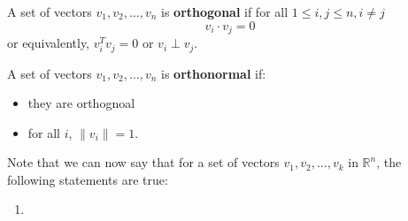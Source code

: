 \begin{definition}
	A set of vectors \(v_1, v_2, \ldots , v_n\) is \textbf{orthogonal} if for all \(1 \leq  i, j \leq n, i \neq j\)
	\[
		v_i \cdot v_j = 0
	\]
	or equivalently, \(v_i^T v_j = 0\) or \(v_i \perp v_j\).
\end{definition}

\begin{definition}
	A set of vectors \(v_1, v_2, \ldots , v_n\) is \textbf{orthonormal} if:
	\begin{itemize}
		\item they are orthognoal
		\item for all \(i\), \(\lVert v_i \rVert = 1\).
	\end{itemize}
\end{definition}

Note that we can now say that for a set of vectors \(v_1, v_2, \ldots , v_k\) in \(\mathbb{R} ^n\), the following statements are true:
\begin{enumerate}
	\item 
\end{enumerate}